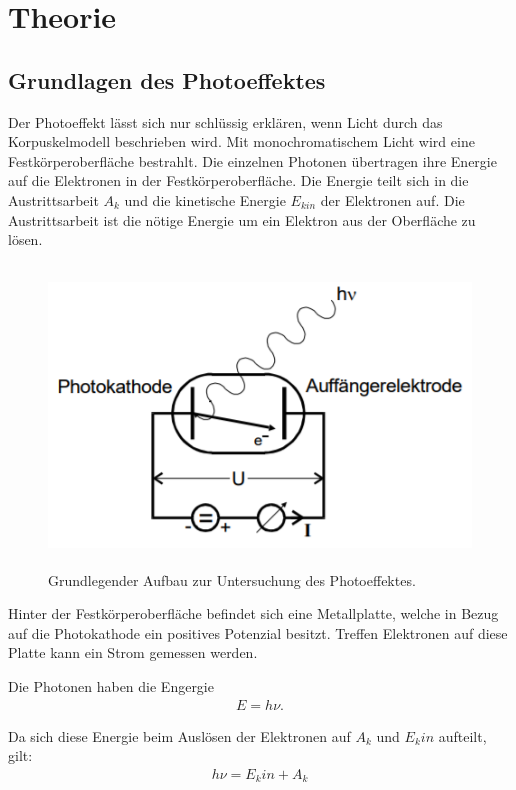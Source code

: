 \section{Theorie}
\label{sec:Theorie}

\cite{sample}

\subsection{Grundlagen des Photoeffektes}
Der Photoeffekt lässt sich nur schlüssig erklären, wenn Licht durch das Korpuskelmodell beschrieben wird.
Mit monochromatischem Licht wird eine Festkörperoberfläche bestrahlt. Die einzelnen Photonen
übertragen ihre Energie auf die Elektronen in der Festkörperoberfläche. Die Energie
teilt sich in die Austrittsarbeit $A_k$ und die kinetische Energie $E_{kin}$ der Elektronen auf.
Die Austrittsarbeit ist die nötige Energie um ein Elektron aus der Oberfläche zu lösen.

\begin{figure}[H]
  \centering
  \includegraphics[height=8cm]{anordnung.PNG}
  \caption{Grundlegender Aufbau zur Untersuchung des Photoeffektes. \cite{sample}}
  \label{fig:kathode}
\end{figure}

Hinter der Festkörperoberfläche befindet sich eine Metallplatte, welche in Bezug auf
die Photokathode ein positives Potenzial besitzt. Treffen Elektronen auf diese Platte
kann ein Strom gemessen werden.

Die Photonen haben die Engergie
\begin{align}
  E = h \nu.
\end{align}

Da sich diese Energie beim Auslösen der Elektronen auf $A_k$ und $E_kin$ aufteilt, gilt:
\begin{align}
  h \nu = E_kin + A_k
\end{align}

